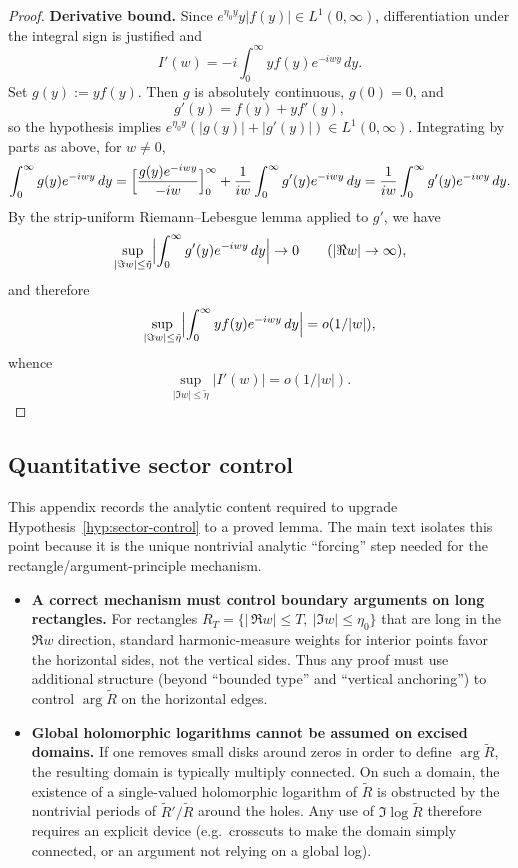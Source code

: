 \documentclass[11pt]{amsart}
\theoremstyle{definition}
\theoremstyle{remark}
\begin{document}
\begin{proof}
\smallskip
\noindent\textbf{Derivative bound.}
Since $e^{\eta_0 y}y|f(y)|\in L^1(0,\infty)$, differentiation under the integral sign is justified and
\[
I'(w)=-i\int_0^\infty y f(y)e^{-iwy}\,dy.
\]
Set $g(y):=y f(y)$. Then $g$ is absolutely continuous, $g(0)=0$, and
\[
g'(y)=f(y)+y f'(y),
\]
so the hypothesis implies $e^{\eta_0 y}(|g(y)|+|g'(y)|)\in L^1(0,\infty)$. Integrating by parts as above,
for $w\neq 0$,
\[
\int_0^\infty g(y)e^{-iwy}\,dy
=
\Bigl[\frac{g(y)e^{-iwy}}{-iw}\Bigr]_{0}^{\infty}
+\frac{1}{iw}\int_0^\infty g'(y)e^{-iwy}\,dy
=
\frac{1}{iw}\int_0^\infty g'(y)e^{-iwy}\,dy.
\]
By the strip-uniform Riemann--Lebesgue lemma applied to $g'$, we have
\[
\sup_{|\Im w|\le\tilde\eta}\Bigl|\int_0^\infty g'(y)e^{-iwy}\,dy\Bigr|\to 0
\qquad (|\Re w|\to\infty),
\]
and therefore
\[
\sup_{|\Im w|\le\tilde\eta}\Bigl|\int_0^\infty y f(y)e^{-iwy}\,dy\Bigr|
=
o(1/|w|),
\]
whence
\[
\sup_{|\Im w|\le\tilde\eta}|I'(w)|=o(1/|w|).
\]

\end{proof}


\subsection{Quantitative sector control}\label{app:sector-proof}

This appendix records the analytic content required to upgrade
Hypothesis~\ref{hyp:sector-control} to a proved lemma.
The main text isolates this point because it is the unique nontrivial
analytic ``forcing'' step needed for the rectangle/argument-principle mechanism.

\begin{itemize}
\item \textbf{A correct mechanism must control boundary arguments on long rectangles.}
For rectangles $R_T=\{|\,\Re w|\le T,\ |\Im w|\le\eta_0\}$ that are long in the $\Re w$ direction,
standard harmonic-measure weights for interior points favor the horizontal sides, not the vertical
sides.  Thus any proof must use additional structure (beyond ``bounded type'' and ``vertical anchoring'')
to control $\arg\widetilde R$ on the horizontal edges.

\item \textbf{Global holomorphic logarithms cannot be assumed on excised domains.}
If one removes small disks around zeros in order to define $\arg \widetilde R$, the resulting domain
is typically multiply connected.  On such a domain, the existence of a single-valued holomorphic
logarithm of $\widetilde R$ is obstructed by the nontrivial periods of $\widetilde R'/\widetilde R$
around the holes.  Any use of $\Im\log\widetilde R$ therefore requires an explicit device
(e.g.\ crosscuts to make the domain simply connected, or an argument not relying on a global log).
\end{itemize}
\end{document}
